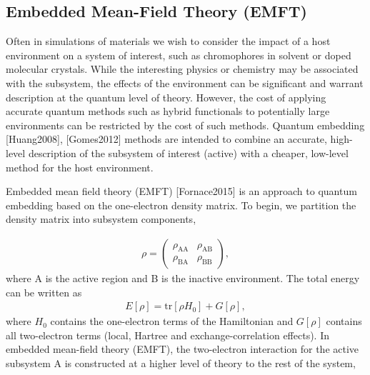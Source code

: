 \documentclass[letterpaper,10pt,english]{sphinxmanual}
\begin{document}
\subsection{Embedded Mean-Field Theory (EMFT)}
\label{\detokenize{EMFT_in_ONETEP:embedded-mean-field-theory-emft}}
Often in simulations of materials we wish to consider the impact of a
host environment on a system of interest, such as chromophores in
solvent or doped molecular crystals. While the interesting physics or
chemistry may be associated with the subsystem, the effects of the
environment can be significant and warrant description at the quantum
level of theory. However, the cost of applying accurate quantum methods
such as hybrid functionals to potentially large environments can be
restricted by the cost of such methods. Quantum embedding
{[}Huang2008{]}, {[}Gomes2012{]} methods are intended to combine
an accurate, high-level description of the subsystem of interest
(active) with a cheaper, low-level method for the host environment.

Embedded mean field theory (EMFT) {[}Fornace2015{]} is an
approach to quantum embedding based on the one-electron density matrix.
To begin, we partition the density matrix into subsystem components,

\label{\detokenize{EMFT_in_ONETEP:equation-emft-dm}}\begin{equation}\label{equation:EMFT_in_ONETEP:emft_dm}
\begin{split}\rho = \begin{pmatrix}
        \rho_\text{AA} & \rho_\text{AB}\\
        \rho_\text{BA} & \rho_\text{BB}
    \end{pmatrix},\end{split}
\end{equation}
where A is the active region and B is the inactive environment. The
total energy can be written as
\begin{equation*}
\begin{split}E{\left[\rho\right]}=\text{tr}{\left[\rho H_0\right]}+G{\left[\rho\right]},\end{split}
\end{equation*}
where \(H_0\) contains the one-electron terms of the Hamiltonian
and \(G{\left[\rho\right]}\) contains all two-electron terms (local,
Hartree and exchange-correlation effects). In embedded mean-field theory
(EMFT), the two-electron interaction for the active subsystem A is
constructed at a higher level of theory to the rest of the system,
\end{document}
